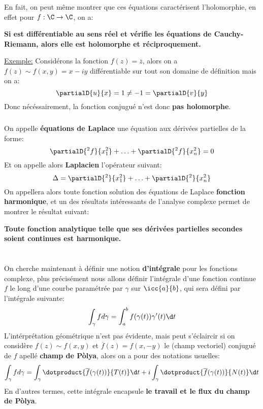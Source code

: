 \subsection*{}
En fait, on peut même montrer que ces équations caractérisent l'holomorphie, en effet pour \(f : \C \rightarrow \C\), on a:
\begin{center}
   \textbf{Si est différentiable \textbf{au sens réel} et vérifie les équations de Cauchy-Riemann, alors elle est holomorphe et réciproquement.}
\end{center}
\uline{Exemple:} Considérons la fonction \(f(z) = \overline{z}\), alors on a \(f(z) \sim f(x, y) = x - iy\) différentiable sur tout son domaine de définition mais on a:
\[
   \partialD{u}{x} = 1 \neq -1 = \partialD{v}{y} 
\]
Donc nécéssairement, la fonction conjugué n'est donc \textbf{pas holomorphe}.
\subsection*{}
On appelle \textbf{équations de Laplace} une équation aux dérivées partielles de la forme:
\[
   \partialD{{}^2f}{x_1^2} + \ldots + \partialD{{}^2f}{x_n^2} = 0
\]
Et on appelle alors \textbf{Laplacien} l'opérateur suivant:
\[
   \Delta = \partialD{{}^2}{x_1^2} + \ldots + \partialD{{}^2}{x_n^2}
\]
On appellera alors toute fonction solution des équations de Laplace \textbf{fonction harmonique}, et un des résultats intéressants de l'analyse complexe permet de montrer le résultat suivant:
\begin{center}
   \textbf{Toute fonction analytique telle que ses dérivées partielles secondes soient continues est harmonique.}
\end{center}
\chapter*{} %
On cherche maintenant à définir une notion \textbf{d'intégrale} pour les fonctions complexe, plus précisément nous allons définir l'intégrale d'une fonction continue \(f\) le long d'une courbe paramétrée par \(\gamma\) sur \(\icc{a}{b}\), qui sera défini par l'intégrale suivante:
\[
   \int_{\gamma} f d\gamma = \int_{a}^{b} f(\gamma(t))\gamma'(t) \d t
\]
L'intérprétation géométrique n'est pas évidente, mais peut s'éclaircir si on considère \(f(z) \sim f(x, y)\) et \(\overline{f}(z) = f(x, -y)\) le (champ vectoriel) conjugué de \(f\) apellé \textbf{champ de Pòlya}, alors on a pour des notations usuelles:
\[
   \int_{\gamma} f d\gamma = \int_{\gamma} \dotproduct{\overline{f}(\gamma(t))}{T(t)} \d t + i \int_{\gamma} \dotproduct{\overline{f}(\gamma(t))}{N(t)}  \d t
\]
En d'autres termes, cette intégrale encapsule \textbf{le travail et le flux du champ de Pòlya}.

